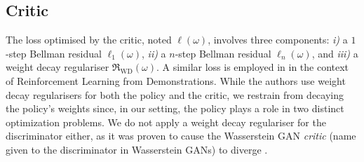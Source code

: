 \subsection{Critic}
The loss optimised by the critic, noted $\ell(\omega)$, involves three
components:
\textit{i)} a $1$-step Bellman residual $\ell_1(\omega)$,
\textit{ii)} a $n$-step Bellman residual $\ell_n(\omega)$, and
\textit{iii)} a weight decay regulariser $\mathfrak{R}_{\text{WD}}(\omega)$.
A similar loss is employed in \cite{Vecerik2017-ue} in the context of
Reinforcement Learning from Demonstrations.
While the authors use weight decay regularisers for both the policy and
the critic, we restrain from decaying the policy's weights since,
in our setting, the policy plays a role in two distinct optimization problems.
We do not apply a weight decay regulariser for the discriminator either,
as it was proven to cause the Wasserstein GAN
\textit{critic}
(name given to the discriminator in Wasserstein GANs) to diverge
\cite{Gulrajani2017-mr}.

